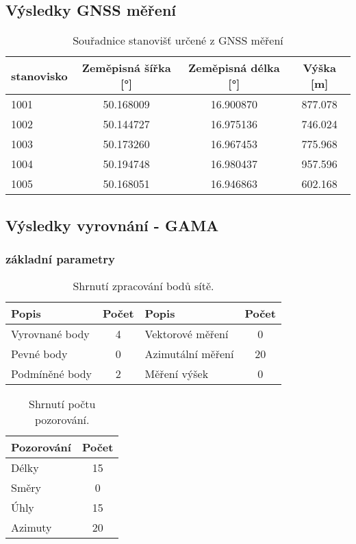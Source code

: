 \subsection{Výsledky GNSS měření}

\begin{table}[H]
\centering

\label{tab:gnss_coords}
\begin{tabular}{lccc}
\hline
stanovisko & Zeměpisná šířka [°] & Zeměpisná délka [°] & Výška [m] \\
\hline
1001 & 50.168009 & 16.900870 & 877.078 \\
1002 & 50.144727 & 16.975136 & 746.024 \\
1003 & 50.173260 & 16.967453 & 775.968 \\
1004 & 50.194748 & 16.980437 & 957.596 \\
1005 & 50.168051 & 16.946863 & 602.168 \\
\hline

\end{tabular}
\caption{Souřadnice stanovišť určené z GNSS měření}
\end{table}

\subsection{Výsledky vyrovnání - GAMA}
\subsubsection{základní parametry}
\begin{table}[H]
    \centering
    \begin{tabular}{@{} l S[table-format=2.0] l S[table-format=2.0] @{}}
    \toprule
    \textbf{Popis} & \textbf{Počet} & \textbf{Popis} & \textbf{Počet} \\
    \midrule
    Vyrovnané body & 4 & Vektorové měření & 0 \\
    Pevné body & 0 & Azimutální měření & 20 \\
    Podmíněné body & 2 & Měření výšek & 0 \\
    \bottomrule
    \end{tabular}
    \caption{Shrnutí zpracování bodů sítě.}
    \label{tab:points_summary_vse}
\end{table}

\begin{table}[H]
    \centering
    \begin{tabular}{@{} l S[table-format=2.0] @{}}
    \toprule
    \textbf{Pozorování} & \textbf{Počet} \\
    \midrule
    Délky & 15 \\
    Směry & 0 \\
    Úhly & 15 \\
    Azimuty & 20 \\
    \bottomrule
    \end{tabular}
    \caption{Shrnutí počtu pozorování.}
    \label{tab:obs_summary_vse}
\end{table}

